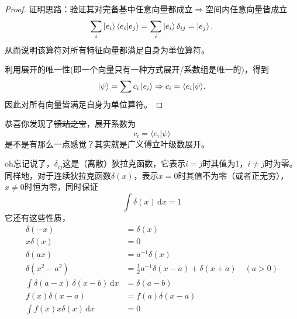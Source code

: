 \documentclass[12pt,a4paper,openany,twoside]{book}
\numberwithin{equation}{section}
\newcommand{\bracket}[2]{\langle #1 | #2 \rangle}
\newcommand{\ud}{\mathrm{d}}
\begin{document}
          \begin{proof}
            证明思路：验证其对完备基中任意向量都成立$\Rightarrow$空间内任意向量皆成立
            \begin{equation}
              \sum_i \ket{e_i}\bracket{e_i}{e_j} = \sum_i\ket{e_i} \delta_{ij} = \ket{e_j}.
            \end{equation}
            从而说明该算符对所有特征向量都满足自身为单位算符。

            利用展开的唯一性(即一个向量只有一种方式展开/系数组是唯一的)，得到
            \begin{equation}
              \ket{\psi} = \sum c_i \ket{e_i} \Rightarrow c_i = \bracket{e_i}{\psi}.
            \end{equation}
            因此对所有向量皆满足自身为单位算符。
          \end{proof}
          恭喜你发现了\sout{镇站之宝}，展开系数为
          \begin{equation}
            c_i = \langle e_i | \psi \rangle 
            \label{expansion coeff}
          \end{equation}
          是不是有那么一点感觉？其实就是广义傅立叶级数展开。

          oh忘记说了，$\delta_{ij}$这是（离散）狄拉克函数，它表示$i=j$时其值为1，$i\neq j$时为零。同样地，对于连续狄拉克函数$\delta(x)$，表示$x=0$时其值不为零（或者正无穷），$x\neq 0$时恒为零，同时保证
          \begin{equation}
            \int \delta(x) \, \ud x = 1 
          \end{equation}
          它还有这些性质，
          \begin{align}
            \delta(-x) & = \delta(x) \\
            x\delta(x) & = 0 \\
            \delta(a x) & = a^{-1} \delta(x)\\
            \delta(x^2-a^2) & = \frac{1}{2} a^{-1} {\delta(x-a)+\delta(x+a)} \quad (a>0)\\
            \int \delta(a-x) \, \delta(x-b) \, \ud x & = \delta(a-b) \\
            f(x) \delta(x-a) &=  f(a)\delta(x-a)\\
            \int f(x)x\delta(x) \, \ud x & = 0
          \end{align}
\end{document}
